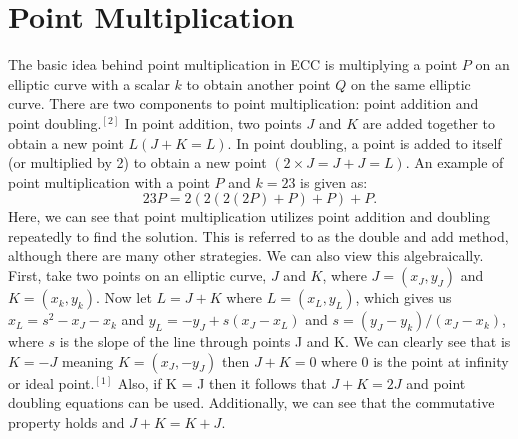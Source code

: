 \documentclass[conference]{IEEEtran}
\begin{document}
\section{Point Multiplication}
The basic idea behind point multiplication in ECC is multiplying a point $P$ on an elliptic curve with a scalar $k$ to obtain another point $Q$ on the same elliptic curve.  There are two components to point multiplication: point addition and point doubling.$^{[2]}$  In point addition, two points $J$ and $K$ are added together to obtain a new point $L (J + K = L)$.  In point doubling, a point is added to itself (or multiplied by 2) to obtain a new point $(2 \times J = J + J = L)$.  An example of point multiplication with a point $P$ and $k=23$ is given as: $$23P = 2(2(2(2P)+P)+P)+P.$$  Here, we can see that point multiplication utilizes point addition and doubling repeatedly to find the solution.  This is referred to as the double and add method, although there are many other strategies.  We can also view this algebraically.  First, take two points on an elliptic curve, $J$ and $K$, where $J = (x_J, y_J)$ and $K = (x_k, y_k)$.  Now let $L = J + K$ where $L = (x_L, y_L)$, which gives us $x_L = s^2 - x_J - x_k$ and $y_L = -y_J + s(x_J - x_L)$ and $s = (y_J - y_k)/(x_J - x_k)$, where $s$ is the slope of the line through points J and K.  We can clearly see that is $K = -J$ meaning $K = (x_J, -y_J)$ then $J + K = 0$ where $0$ is the point at infinity or ideal point.$^{[1]}$  Also, if K = J then it follows that $J + K = 2J$ and point doubling equations can be used.  Additionally, we can see that the commutative property holds and $J + K = K + J$.
\end{document}
